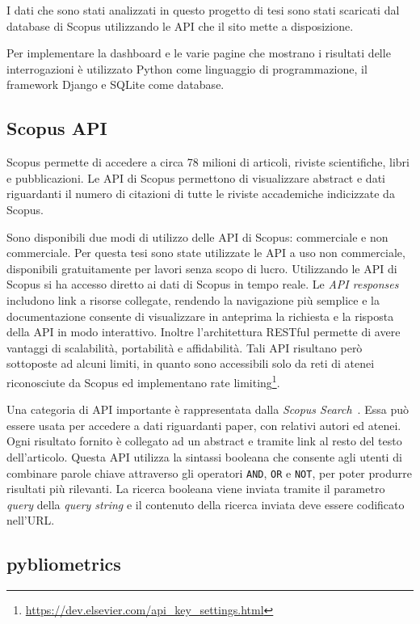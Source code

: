 I dati che sono stati analizzati in questo progetto di tesi sono stati scaricati
dal database di Scopus utilizzando le API che il sito mette a disposizione.

Per implementare la dashboard e le varie pagine che mostrano i risultati delle
interrogazioni è utilizzato Python come linguaggio di programmazione, il
framework Django e SQLite come database.

\subsection{Scopus API}

Scopus permette di accedere a circa 78 milioni di articoli, riviste
scientifiche, libri e pubblicazioni. Le API di Scopus permettono di visualizzare
abstract e dati riguardanti il numero di citazioni di tutte le riviste
accademiche indicizzate da Scopus.

Sono disponibili due modi di utilizzo delle API di Scopus: commerciale e
non commerciale. Per questa tesi sono state utilizzate le API a uso non
commerciale, disponibili gratuitamente per lavori senza scopo di lucro.
Utilizzando le API di Scopus si ha accesso diretto ai dati di Scopus in tempo
reale. Le \textit{API responses} includono link a risorse collegate, rendendo
la navigazione più semplice e la documentazione consente di visualizzare in
anteprima la richiesta e la risposta della API in modo interattivo. Inoltre
l'architettura RESTful permette di avere vantaggi di scalabilità, portabilità
e affidabilità.
Tali API risultano però sottoposte ad alcuni limiti, in quanto sono accessibili
solo da reti di atenei riconosciute da Scopus ed implementano rate limiting\footnote{\url{https://dev.elsevier.com/api_key_settings.html}}.

Una categoria di API importante è rappresentata dalla \textit{Scopus Search}~\cite{scopussearch}.
Essa può essere usata per accedere a dati riguardanti
paper, con relativi autori ed atenei. Ogni risultato fornito è collegato ad un
abstract e tramite link al resto del testo dell'articolo.
Questa API utilizza la sintassi booleana che consente agli utenti di combinare
parole chiave attraverso gli operatori \texttt{AND}, \texttt{OR} e \texttt{NOT},
per poter produrre risultati  più rilevanti. La ricerca booleana viene inviata
tramite il parametro \textit{query} della \textit{query string} e il contenuto
della ricerca inviata deve essere  codificato nell'URL.

\subsection{pybliometrics}\label{sec:pybliometrics}

